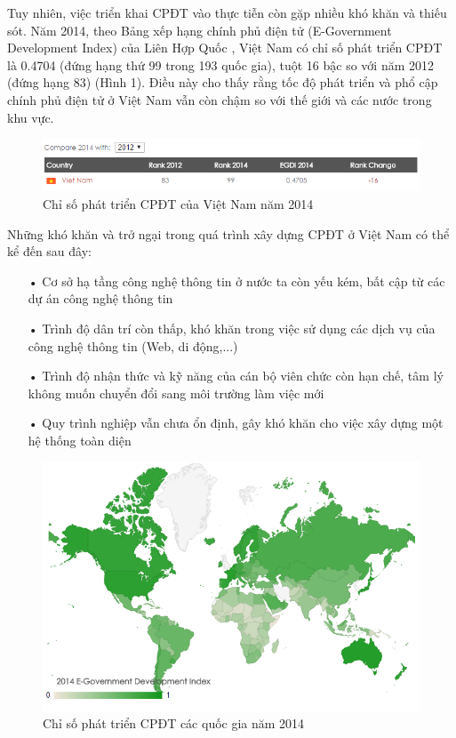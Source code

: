 \documentclass[a4paper]{article}
\begin{document}
Tuy nhiên, việc triển khai CPĐT vào thực tiễn còn gặp nhiều khó khăn và thiếu sót. Năm 2014, theo Bảng xếp hạng chính phủ điện tử (E-Government Development Index) của Liên Hợp Quốc \cite{bib3}, Việt Nam có chỉ số phát triển CPĐT là 0.4704 (đứng hạng thứ 99 trong 193 quốc gia), tuột 16 bậc so với năm 2012 (đứng hạng 83) (Hình 1). Điều này cho thấy rằng tốc độ phát triển và phổ cập chính phủ điện tử ở Việt Nam vẫn còn chậm so với thế giới và các nước trong khu vực.
\begin{center}
    \begin{figure}[htp]
    \begin{center}
     \includegraphics[scale=.85]{2014-vietnam-edgi.PNG}
    \end{center}
    \caption{Chỉ số phát triển CPĐT của Việt Nam năm 2014}
    \label{refhinh1}
    \end{figure}
\end{center}
Những khó khăn và trở ngại trong quá trình xây dựng CPĐT ở Việt Nam có thể kể đến sau đây:
\begin{itemize}
	\item[•]Cơ sở hạ tầng công nghệ thông tin ở nước ta còn yếu kém, bất cập từ các dự án công nghệ thông tin
	\item[•]Trình độ dân trí còn thấp, khó khăn trong việc sử dụng các dịch vụ của công nghệ thông tin (Web, di động,...)
	\item[•]Trình độ nhận thức và kỹ năng của cán bộ viên chức còn hạn chế, tâm lý không muốn chuyển đổi sang môi trường làm việc mới
	\item[•]Quy trình nghiệp vẫn chưa ổn định, gây khó khăn cho việc xây dựng một hệ thống toàn diện
\end{itemize}
\begin{center}
    \begin{figure}[htp]
    \begin{center}
     \includegraphics[scale=.8]{2014-edgi.PNG}
    \end{center}
    \caption{Chỉ số phát triển CPĐT các quốc gia năm 2014}
    \label{refhinh2}
    \end{figure}
\end{center}
\end{document}

